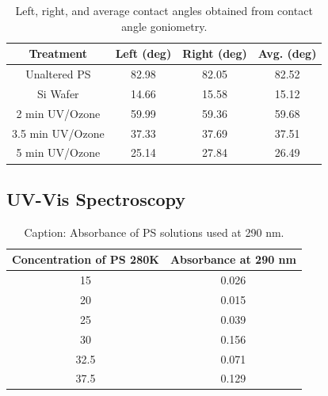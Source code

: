\documentclass[twocolumn]{article}
\begin{document}
                \begin{table}
                    \centering
                    \begin{tabular}{@{}cccc@{}}
                        \toprule
                        Treatment                & Left (deg) & Right (deg) & Avg. (deg) \\ \midrule
                        Unaltered PS    & 82.98          & 82.05           & 82.52             \\
                        Si Wafer            & 14.66          & 15.58           & 15.12             \\
                        2 min UV/Ozone   & 59.99          & 59.36           & 59.68             \\
                        3.5 min UV/Ozone & 37.33          & 37.69           & 37.51             \\
                        5 min UV/Ozone   & 25.14          & 27.84           & 26.49             \\ \bottomrule
                        \end{tabular}
                    \caption{Left, right, and average contact angles obtained from contact angle goniometry.}\label{tab:contact}
                \end{table}
            
            \subsection{UV-Vis Spectroscopy}

                \begin{table}
                    \centering
                    \begin{tabular}{@{}cc@{}}
                        \toprule
                        Concentration of PS 280K & Absorbance at 290 nm \\ \midrule
                        15                                & 0.026                \\
                        20                                & 0.015                \\
                        25                                & 0.039                \\
                        30                                & 0.156                \\
                        32.5                              & 0.071                \\
                        37.5                              & 0.129                \\ \bottomrule
                    \end{tabular}
                    \caption{Caption: Absorbance of PS solutions used at 290 nm.}\label{tab:abs}
                \end{table}
\end{document}
